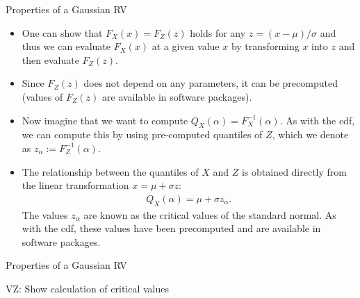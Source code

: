 \documentclass[9pt]{beamer}
\begin{document}
%
\begin{frame}{Properties of a Gaussian RV}

\begin{itemize}
\item One can show that $F_X(x)=F_Z(z)$ holds for any $z=(x-\mu)/\sigma$ and thus we can evaluate $F_X(x)$ at a given value $x$ by transforming $x$ into $z$ and then evaluate $F_Z(z)$. 

\item Since $F_Z(z)$ does not depend on any parameters, it can be precomputed (values of $F_Z(z)$ are available in software packages). 

\item Now imagine that we want to compute $Q_X(\alpha)=F^{-1}_X(\alpha)$. As with the cdf, we can compute this by using pre-computed quantiles of $Z$, which we denote as $z_\alpha:=F_Z^{-1}(\alpha)$. 

\item The relationship between the quantiles of $X$ and $Z$ is obtained directly from the linear transformation $x=\mu+\sigma z$:
\begin{align*}
Q_X(\alpha)=\mu+\sigma z_\alpha.
\end{align*}
The values $z_\alpha$ are known as the critical values of the standard normal. As with the cdf, these values have been precomputed and are available in software packages. 
\end{itemize}

\end{frame}

%
\begin{frame}{Properties of a Gaussian RV}
\begin{block}{}
{\color{red} VZ: Show calculation of critical values}
\end{block}
\end{frame}
\end{document}
